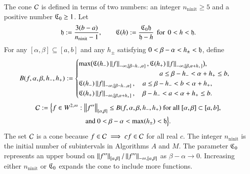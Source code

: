 \documentclass[review]{elsarticle}
\theoremstyle{definition}
\renewcommand{\cw}{W}
\DeclareMathOperator{\ninit}{ninit}
\begin{document}
The cone $\cc$ is defined in terms of two numbers: an integer $n_{\ninit} \ge 5$
and a positive number $\fC_0 \ge 1$. Let
\begin{equation}
\label{hCdef}
\fh := \frac{3(b-a)}{n_{\ninit}-1}, \qquad \fC(h) := \frac{\fC_0 \fh}{\fh - h} \mbox{\, for \,} 0<h<\fh.
\end{equation}
For any $[\alpha, \beta] \subseteq [a,b]$ and any $h_{\pm}$ satisfying $0 <
\beta - \alpha < h_{\pm} < \fh$, define
\begin{equation} \label{tbdef}
B(f,\alpha,\beta,h_-,h_+) :=
\begin{cases}
   \max\bigl(\fC(h_{-}) \norm[-\infty,{[\beta-h_-,\alpha]}]{f},\fC(h_{+}) \norm[-\infty,{[\beta, \alpha+h_+]}]{f}\bigr), 
\\                                             \hspace{26ex} a \le \beta- h_- <  \alpha + h_+ \le b,
\\ \fC(h_{-}) \norm[-\infty,{[\beta-h_-,\alpha]}]{f},  \quad a \le \beta- h_- < b< \alpha + h_+,
\\ \fC(h_{+}) \norm[-\infty,{[\beta, \alpha+h_+]}]{f}, \quad \beta- h_- <  a  < \alpha + h_+ \le b.
\end{cases} 
\end{equation}
\begin{multline} \label{conedef}
 \cc := \Bigl \{
 f  \in    \cw^{2,\infty}:   \norm[{[\alpha,\beta]}]{f''}  \le B(f,\alpha,\beta,h_-,h_+)  \text{ for all } [\alpha,\beta] \subset [a,b],
\\ \text{and } 0 < \beta - \alpha < \max(h_{\pm}) < \fh  \Bigr \}.
\end{multline}
The set $\cc$ is a cone because $f \in \cc \implies cf \in \cc$ for all real
$c$. The integer $n_{\ninit}$ is the initial number of subintervals in
Algorithms $A$ and $M$. The parameter $\fC_0$ represents an upper bound on
$\norm[{[\alpha,\beta]}]{f''}/\norm[-\infty,{[\alpha,\beta]}]{f''}$ as $\beta -
\alpha \to 0$. Increasing either $n_{\ninit}$ or $\fC_0$ expands the cone to
include more functions.
\end{document}

